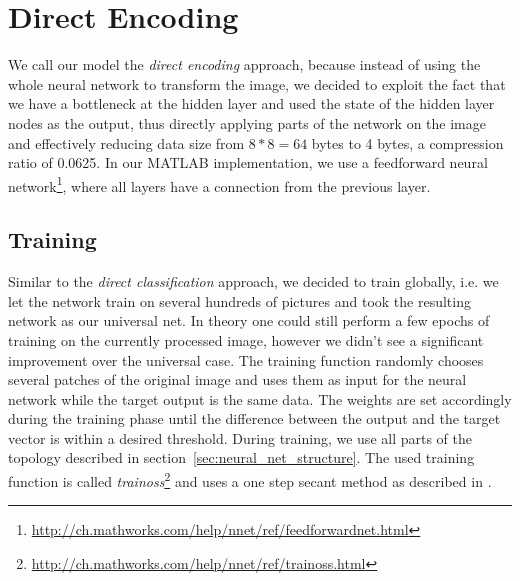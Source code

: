 \section{Direct Encoding} \label{sec:de}
We call our model the \emph{direct encoding} approach, because instead of using the whole neural network to transform the image, we decided to exploit the fact that we have a bottleneck at the hidden layer and used the state of the hidden layer nodes as the output, thus directly applying parts of the network on the image and effectively reducing data size from \(8 * 8 = 64\) bytes to 4 bytes, a compression ratio of 0.0625. In our MATLAB implementation, we use a feedforward neural network\footnote{\url{http://ch.mathworks.com/help/nnet/ref/feedforwardnet.html}}, where all layers have a connection from the previous layer.

\subsection{Training} \label{sec:trainfcn}
Similar to the \emph{direct classification} approach, we decided to train globally, i.e. we let the network train on several hundreds of pictures and took the resulting network as our universal net. In theory one could still perform a few epochs of training on the currently processed image, however we didn't see a significant improvement over the universal case. 
The training function randomly chooses several patches of the original image and uses them as input for the neural network while the target output is the same data. The weights are set accordingly during the training phase until the difference between the output and the target vector is within a desired threshold. During training, we use all parts of the topology described in section~\ref{sec:neural_net_structure}. The used training function is called \emph{trainoss}\footnote{\url{http://ch.mathworks.com/help/nnet/ref/trainoss.html}} and uses a one step secant method as described in \cite{Battiti89}. 


